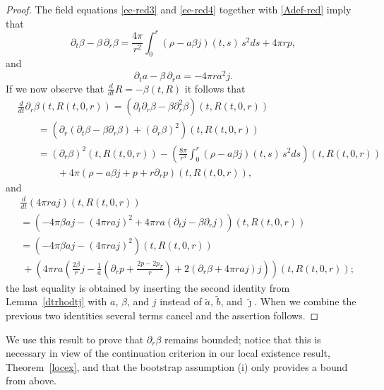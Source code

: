 \documentclass[11pt]{article}
\begin{document}
\begin{proof}
  The field equations \eqref{ee-red3} and \eqref{ee-red4}
  together with \eqref{Adef-red} imply that
  \[
  \partial_t\beta-\beta\,\partial_r\beta =
  \frac{4\pi}{r^2}
  \int_0^r\left(\rho - a \beta j\right)(t,s)\,s^2 ds + 4\pi r p,
  \]
  and
  \[
  \partial_t a -\beta\, \partial_r a =
  - 4\pi r a^2 j .
  \]
  If we now observe that $\frac{d}{dt} R = -\beta(t,R)$ it follows that 
  \begin{align*}
    &
    \frac{d}{dt} \partial_r \beta (t,R(t,0,r))
    =\left(\partial_t\partial_r \beta - \beta \partial_r^2\beta\right)
    (t,R(t,0,r))\\
    & \qquad
    =\left(\partial_r\left(\partial_t \beta - \beta \partial_r\beta\right) +
    (\partial_r\beta)^2 \right) (t,R(t,0,r))\\
    & \qquad
    = (\partial_r\beta)^2 (t,R(t,0,r))
    - \left(\frac{8\pi}{r^3}\int_0^r (\rho - a \beta j)(t,s)\,
    s^2 ds\right)(t,R(t,0,r))\\
    & \qquad\qquad
    {} + 4\pi \left(\rho - a \beta j + p + r \partial_r p\right)(t,R(t,0,r)), 
  \end{align*}
  and
  \begin{align*}
    &
    \frac{d}{dt}\left(4\pi r a j\right) (t,R(t,0,r))\\
    & =
    \left( -4\pi \beta a j - (4\pi r a j)^2
    + 4 \pi r a (\partial_t j - \beta \partial_r j)
    \right)(t,R(t,0,r))\\
    & =
     \left(- 4\pi \beta a j - (4\pi r a j)^2\right)(t,R(t,0,r))\\
    &\
    + \left(4 \pi r a \left(\frac{2\beta}{r} j
    - \frac{1}{a}(\partial_r p +\frac{2p-2p_T}{r})
    +2 (\partial_r\beta + 4\pi r a j) j\right) \right)(t,R(t,0,r));
  \end{align*}
  the last equality is obtained by inserting the second identity from
  Lemma~\ref{dtrhodtj} with $a$, $\beta$, and $j$
  instead of $\tilde a$, $\tilde b$,
  and $\tilde\jmath$. When we combine the previous
  two identities several terms cancel 
  and the assertion follows.
\end{proof}

We use this result to prove that $\partial_r\beta$ remains bounded;
notice that this is necessary in view of the continuation criterion
in our local existence result, Theorem~\ref{locex},
and that the bootstrap assumption (i) only provides a bound from above.
\end{document}
